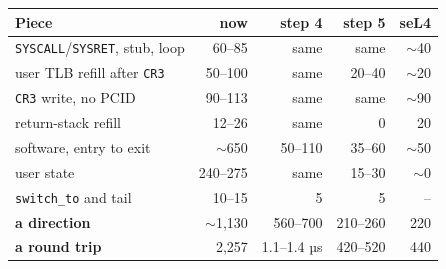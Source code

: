 \begin{tabular}{@{}lrrrr@{}}
\toprule
Piece & now & step 4 & step 5 & seL4 \\
\midrule
\texttt{SYSCALL}/\texttt{SYSRET}, stub, loop & 60--85 & same & same & $\sim$40 \\
user TLB refill after \texttt{CR3} & 50--100 & same & 20--40 & $\sim$20 \\
\texttt{CR3} write, no PCID & 90--113 & same & same & $\sim$90 \\
return-stack refill & 12--26 & same & 0 & 20 \\
software, entry to exit & $\sim$650 & 50--110 & 35--60 & $\sim$50 \\
user state & 240--275 & same & 15--30 & $\sim$0 \\
\texttt{switch\_to} and tail & 10--15 & 5 & 5 & -- \\
\midrule
\textbf{a direction} & $\sim$1,130 & 560--700 & 210--260 & 220 \\
\textbf{a round trip} & 2,257 & 1.1--1.4 µs & 420--520 & 440 \\
\bottomrule
\end{tabular}
